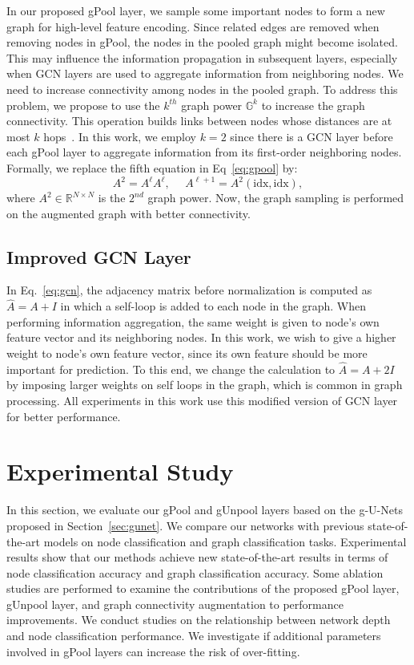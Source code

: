 \documentclass{article}
\begin{document}
In our proposed gPool layer, we sample some important nodes to form
a new graph for high-level feature encoding. Since related edges are
removed when removing nodes in gPool, the nodes in the pooled graph
might become isolated. This may influence the information
propagation in subsequent layers, especially when GCN layers are
used to aggregate information from neighboring nodes. We need to
increase connectivity among nodes in the pooled graph. To address
this problem, we propose to use the $k^{th}$ graph power
$\mathbb{G}^k$ to increase the graph connectivity. This operation
builds links between nodes whose distances are at most $k$
hops~\citep{chepuri2016subsampling}. In this work, we employ $k=2$
since there is a GCN layer before each gPool layer to aggregate
information from its first-order neighboring nodes. Formally, we
replace the fifth equation in Eq~\ref{eq:gpool} by:
\begin{equation}
A^{2} = A^{\ell}A^{\ell}, \,\,\,\,\,\,\,\,A^{\ell+1} =
A^{2}(\mbox{idx}, \mbox{idx}), \label{eq:gaug}
\end{equation}
where $A^2 \in \mathbb{R}^{N \times N}$ is the $2^{nd}$ graph power.
Now, the graph sampling is performed on the augmented graph with
better connectivity.



\subsection{Improved GCN Layer}

In Eq.~\ref{eq:gcn}, the adjacency matrix before normalization is
computed as $\hat A = A + I$ in which a self-loop is added to each
node in the graph. When performing information aggregation, the same
weight is given to node's own feature vector and its neighboring
nodes. In this work, we wish to give a higher weight to node's own
feature vector, since its own feature should be more important for
prediction. To this end, we change the calculation to $\hat{A} = A +
2I$ by imposing larger weights on self loops in the graph, which is
common in graph processing. All experiments in this work use this
modified version of GCN layer for better performance.


\section{Experimental Study}

In this section, we evaluate our gPool and gUnpool layers based on
the g-U-Nets proposed in Section~\ref{sec:gunet}. We compare our
networks with previous state-of-the-art models on node
classification and graph classification tasks.
Experimental results show that our methods achieve new
state-of-the-art results in terms of node classification accuracy
and graph classification accuracy. Some ablation
studies are performed to examine the contributions of the proposed
gPool layer, gUnpool layer, and graph connectivity augmentation to
performance improvements. We conduct studies on the relationship
between network depth and node classification performance. We
investigate if additional parameters involved in gPool layers can
increase the risk of over-fitting.
\end{document}
